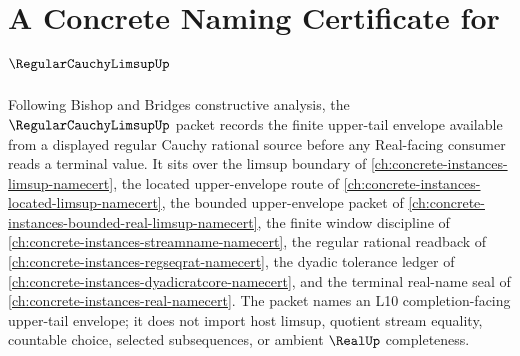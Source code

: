 \chapter{A Concrete Naming Certificate for $\RegularCauchyLimsupUp$}
\label{ch:concrete-instances-regular-cauchy-limsup-namecert}

Following Bishop and Bridges constructive analysis, the $\RegularCauchyLimsupUp$ packet records the finite upper-tail envelope available from a displayed regular Cauchy rational source before any Real-facing consumer reads a terminal value. It sits over the limsup boundary of \autoref{ch:concrete-instances-limsup-namecert}, the located upper-envelope route of \autoref{ch:concrete-instances-located-limsup-namecert}, the bounded upper-envelope packet of \autoref{ch:concrete-instances-bounded-real-limsup-namecert}, the finite window discipline of \autoref{ch:concrete-instances-streamname-namecert}, the regular rational readback of \autoref{ch:concrete-instances-regseqrat-namecert}, the dyadic tolerance ledger of \autoref{ch:concrete-instances-dyadicratcore-namecert}, and the terminal real-name seal of \autoref{ch:concrete-instances-real-namecert}. The packet names an L10 completion-facing upper-tail envelope; it does not import host limsup, quotient stream equality, countable choice, selected subsequences, or ambient $\RealUp$ completeness.

